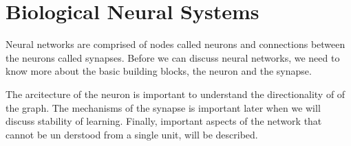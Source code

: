 










\section{Biological Neural Systems} 
\label{secTheBiologicalNeuralSystem}

Neural networks are comprised of nodes called neurons and connections between the neurons called synapses. 
Before we can discuss neural networks, we need to know more about the basic building blocks, the neuron and the synapse. 

The arcitecture of the neuron is important to understand the directionality of of the graph. %
	The mechanisms of the synapse is important later when we will discuss stability of learning. 
Finally, important aspects of the network that cannot be un derstood from a single unit, will be described.


